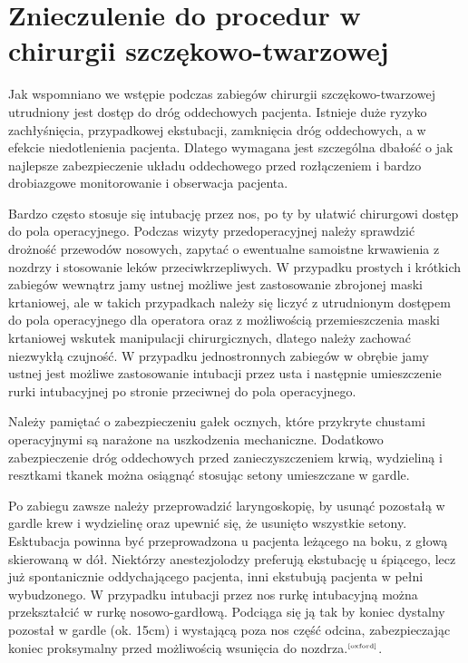 \documentclass[a4paper, 12pt]{report}
\newcommand\cyt[1]{$^{\tiny{\cite{#1}}}$}
\begin{document}
\chapter{Znieczulenie do procedur w chirurgii szczękowo-twarzowej}

Jak wspomniano we wstępie podczas zabiegów chirurgii
szczękowo-twarzowej utrudniony jest dostęp do dróg oddechowych
pacjenta. Istnieje duże ryzyko zachłyśnięcia, przypadkowej ekstubacji,
zamknięcia dróg oddechowych, a w efekcie niedotlenienia
pacjenta. Dlatego wymagana jest szczególna dbałość o jak najlepsze
zabezpieczenie układu oddechowego przed rozłączeniem i bardzo
drobiazgowe monitorowanie i obserwacja pacjenta. 

Bardzo często stosuje się intubację przez nos, po ty by ułatwić
chirurgowi dostęp do pola operacyjnego. Podczas wizyty
przedoperacyjnej należy sprawdzić drożność przewodów nosowych, zapytać
o ewentualne samoistne krwawienia z nozdrzy i stosowanie leków
przeciwkrzepliwych. W przypadku prostych i krótkich zabiegów wewnątrz
jamy ustnej możliwe jest zastosowanie zbrojonej maski krtaniowej, ale
w takich przypadkach należy się liczyć z utrudnionym dostępem do pola
operacyjnego dla operatora oraz z możliwością przemieszczenia maski
krtaniowej wskutek manipulacji chirurgicznych, dlatego należy zachować
niezwykłą czujność. W przypadku jednostronnych zabiegów w obrębie jamy
ustnej jest możliwe zastosowanie intubacji przez usta i następnie
umieszczenie rurki intubacyjnej po stronie przeciwnej do pola
operacyjnego.

Należy pamiętać o zabezpieczeniu gałek ocznych, które przykryte
chustami operacyjnymi są narażone na uszkodzenia
mechaniczne. Dodatkowo zabezpieczenie dróg oddechowych przed
zanieczyszczeniem krwią, wydzieliną i resztkami tkanek można osiągnąć
stosując setony umieszczane w gardle.

Po zabiegu zawsze należy przeprowadzić laryngoskopię, by usunąć
pozostałą w gardle krew i wydzielinę oraz upewnić się, że usunięto
wszystkie setony. Esktubacja powinna być przeprowadzona u pacjenta
leżącego na boku, z głową skierowaną w dół. Niektórzy anestezjolodzy
preferują ekstubację u śpiącego, lecz już spontanicznie oddychającego
pacjenta, inni ekstubują pacjenta w pełni wybudzonego. W przypadku
intubacji przez nos rurkę intubacyjną można przekształcić w rurkę
nosowo-gardłową. Podciąga się ją tak by koniec dystalny pozostał w
gardle (ok. 15cm) i wystającą poza nos część odcina, zabezpieczając
koniec proksymalny przed możliwością wsunięcia do
nozdrza.\cyt{oxford}.
\end{document}

